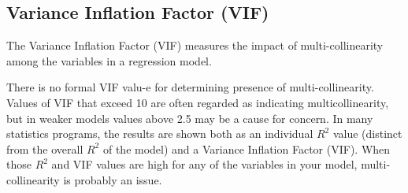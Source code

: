 \documentclass[a4paper,12pt]{article}
\begin{document}
%
%
%
%
%
\subsection{Variance Inflation Factor (VIF)}



The Variance Inflation Factor (VIF) measures the impact of multi-collinearity among the variables in a regression model. 

There is no formal VIF valu-e for determining presence of multi-collinearity. Values of VIF that exceed 10 are often regarded as indicating multicollinearity, but in weaker models values above 2.5 may be a cause for concern. In many statistics programs, the results are shown both as an individual $R^2$ value (distinct from the overall $R^2$ of the model) and a Variance Inflation Factor (VIF). When those $R^2$ and VIF values are high for any of the variables in your model, multi-collinearity is probably an issue. 
\end{document}
